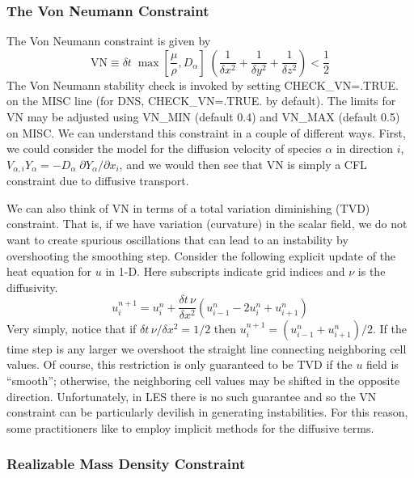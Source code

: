 \documentclass[11pt]{book}
\begin{document}
\subsubsection{The Von Neumann Constraint}

The Von Neumann constraint is given by
\begin{equation}
\mbox{VN} \equiv  \delta t \; \max \left[ \frac{\mu}{\rho},D_\alpha \right] \; \left( \frac{1}{\delta x^2}+\frac{1}{\delta y^2}+\frac{1}{\delta z^2} \right) < \frac{1}{2}
\end{equation}
The Von Neumann stability check is invoked by setting {\ct CHECK\_VN=.TRUE.} on the {\ct MISC} line (for DNS, {\ct CHECK\_VN=.TRUE.} by default). The limits for VN may be adjusted using {\ct VN\_MIN} (default 0.4) and {\ct VN\_MAX} (default 0.5) on {\ct MISC}. We can understand this constraint in a couple of different ways.  First, we could consider the model for the diffusion velocity of species $\alpha$ in direction $i$, $V_{\alpha,i} Y_\alpha = -D_\alpha \; \partial Y_\alpha/\partial x_i$, and we would then see that VN is simply a CFL constraint due to diffusive transport.

We can also think of VN in terms of a total variation diminishing (TVD) constraint.  That is, if we have variation (curvature) in the scalar field, we do not want to create spurious oscillations that can lead to an instability by overshooting the smoothing step.  Consider the following explicit update of the heat equation for $u$ in 1-D. Here subscripts indicate grid indices and $\nu$ is the diffusivity.
\begin{equation}
u_i^{n+1} = u_i^n + \frac{\delta t \, \nu}{\delta x^2} (u_{i-1}^n - 2u_i^n + u_{i+1}^n )
\end{equation}
Very simply, notice that if $\delta t \, \nu/\delta x^2 = 1/2$ then $u_i^{n+1} = (u_{i-1}^n + u_{i+1}^n)/2$.  If the time step is any larger we overshoot the straight line connecting neighboring cell values.  Of course, this restriction is only guaranteed to be TVD if the $u$ field is ``smooth''; otherwise, the neighboring cell values may be shifted in the opposite direction.  Unfortunately, in LES there is no such guarantee and so the VN constraint can be particularly devilish in generating instabilities. For this reason, some practitioners like to employ implicit methods for the diffusive terms.

\subsubsection{Realizable Mass Density Constraint}
\end{document}
